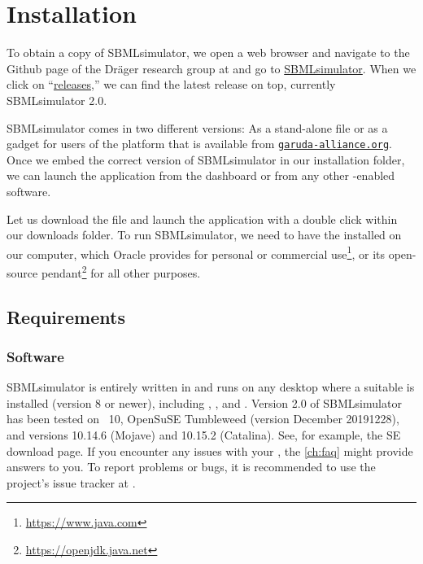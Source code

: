 
\chapter{Installation}

To obtain a copy of SBMLsimulator, we open a web browser and navigate to the Github page of the Dräger research group at  and go to \href{https://github.com/draeger-lab/SBMLsimulator/}{SBMLsimulator}. When we click on ``\href{https://github.com/draeger-lab/SBMLsimulator/releases/}{releases},'' we can find the latest release on top, currently SBMLsimulator 2.0.

SBMLsimulator comes in two different versions: As a stand-alone \JAR file or as a gadget for users of the \Garuda platform that is available from \href{http://garuda-alliance.org}{\texttt{garuda-alliance.org}}.
Once we embed the correct version of SBMLsimulator in our \Garuda installation folder, we can launch the application from the \Garuda dashboard or from any other \Garuda-enabled software.

Let us download the \JAR file and launch the application with a double click within our downloads folder.
To run SBMLsimulator, we need to have the \JVM installed on our computer, which Oracle provides for personal or commercial use\footnote{\url{https://www.java.com}}, or its open-source pendant\footnote{\url{https://openjdk.java.net}\label{fn:jvmldl}} for all other purposes.

\section{Requirements}
\subsection{Software}

SBMLsimulator is entirely written in \Java and runs on any desktop \OS
where a suitable \JVM is installed (\JDK version 8 or newer), including \Windows, \Linux, and \MacOSX.
Version 2.0 of SBMLsimulator has been tested on \Windows~10, OpenSuSE Tumbleweed (version December 20191228), and
\MacOSX versions 10.14.6 (Mojave) and 10.15.2 (Catalina).
See, for example, the \Java SE download
page.
If you encounter any issues with your \OS, the \cref{ch:faq} might provide answers to you.
To report problems or bugs, it is recommended to use the project's issue tracker at .


